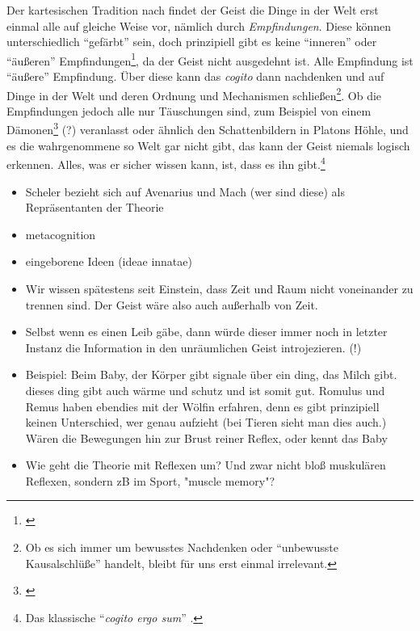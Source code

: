 \documentclass[a4paper, 12pt]{article}
\begin{document}
\begin{onehalfspace}
Der kartesischen Tradition nach findet der Geist die Dinge in der Welt erst einmal alle auf gleiche Weise vor, nämlich durch \emph{Empfindungen}. Diese können unterschiedlich "`gefärbt"' sein, doch prinzipiell gibt es keine "`inneren"' oder "`äußeren"' Empfindungen\footnote{\Cite[Vgl.][S. ?? (501?)]{scheler-ethik}}, da der Geist nicht ausgedehnt ist. Alle Empfindung ist "`äußere"' Empfindung. Über diese kann das \emph{cogito} dann nachdenken und auf Dinge in der Welt und deren Ordnung und Mechanismen schließen\footnote{Ob es sich immer um bewusstes Nachdenken oder "`unbewusste Kausalschlüße"' handelt, bleibt für uns erst einmal irrelevant.}. Ob die Empfindungen jedoch alle nur Täuschungen sind, zum Beispiel von einem Dämonen\footnote{\Cite[Vgl.][S.?]{descartes}} (?) veranlasst oder ähnlich den Schattenbildern in Platons Höhle, und es die wahrgenommene so Welt gar nicht gibt, das kann der Geist niemals logisch erkennen. Alles, was er sicher wissen kann, ist, dass es ihn gibt.\footnote{Das klassische "`\emph{cogito ergo sum}"' .}


\begin{itemize}
  \item Scheler bezieht sich auf Avenarius und Mach (wer sind diese) als Repräsentanten der Theorie
  \item metacognition
  \item eingeborene Ideen (ideae innatae)
  \item Wir wissen spätestens seit Einstein, dass Zeit und Raum nicht voneinander zu trennen sind. Der Geist wäre also auch außerhalb von Zeit. 
  \item Selbst wenn es einen Leib gäbe, dann würde dieser immer noch in letzter Instanz die Information in den unräumlichen Geist introjezieren. (!)
  \item Beispiel: Beim Baby, der Körper gibt signale über ein ding, das Milch gibt. dieses ding gibt auch wärme und schutz und ist somit gut. Romulus und Remus haben ebendies mit der Wölfin erfahren, denn es gibt prinzipiell keinen Unterschied, wer genau aufzieht (bei Tieren sieht man dies auch.) Wären die Bewegungen hin zur Brust reiner Reflex, oder kennt das Baby 
  \item Wie geht die Theorie mit Reflexen um? Und zwar nicht bloß muskulären Reflexen, sondern zB im Sport, "muscle memory"?
\end{itemize}



\end{onehalfspace}
\end{document}
